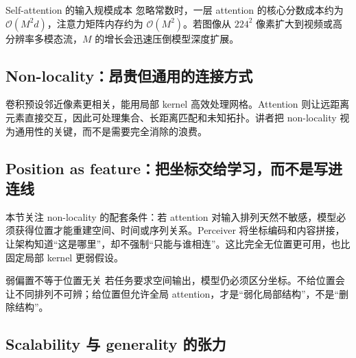 
\begin{importantbox}{Self-attention 的输入规模成本}
忽略常数时，一层 attention 的核心分数成本约为 $\mathcal{O}(M^2d)$，注意力矩阵内存约为 $\mathcal{O}(M^2)$。若图像从 $224^2$ 像素扩大到视频或高分辨率多模态流，$M$ 的增长会迅速压倒模型深度扩展。
\end{importantbox}

\subsection{Non-locality：昂贵但通用的连接方式}

卷积预设邻近像素更相关，能用局部 kernel 高效处理网格。Attention 则让远距离元素直接交互，因此可处理集合、长距离匹配和未知拓扑。讲者把 non-locality 视为通用性的关键，而不是需要完全消除的浪费。



\subsection{Position as feature：把坐标交给学习，而不是写进连线}

本节关注 non-locality 的配套条件：若 attention 对输入排列天然不敏感，模型必须获得位置才能重建空间、时间或序列关系。Perceiver 将坐标编码和内容拼接，让架构知道“这是哪里”，却不强制“只能与谁相连”。这比完全无位置更可用，也比固定局部 kernel 更弱假设。


\begin{warningbox}{弱偏置不等于位置无关}
若任务要求空间输出，模型仍必须区分坐标。不给位置会让不同排列不可辨；给位置但允许全局 attention，才是“弱化局部结构”，不是“删除结构”。
\end{warningbox}

\subsection{Scalability 与 generality 的张力}

